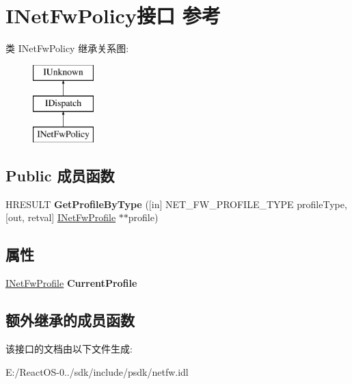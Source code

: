 \hypertarget{interface_i_net_fw_policy}{}\section{I\+Net\+Fw\+Policy接口 参考}
\label{interface_i_net_fw_policy}
类 I\+Net\+Fw\+Policy 继承关系图\+:\begin{figure}[H]
\begin{center}
\leavevmode
\includegraphics[height=3.000000cm]{interface_i_net_fw_policy}
\end{center}
\end{figure}
\subsection*{Public 成员函数}
\begin{DoxyCompactItemize}
\item 
\mbox{\label{interface_i_net_fw_policy_a75deeb7d53617c3ca431bfe8496f6f91}} 
H\+R\+E\+S\+U\+LT {\bfseries Get\+Profile\+By\+Type} (\mbox{[}in\mbox{]} N\+E\+T\+\_\+\+F\+W\+\_\+\+P\+R\+O\+F\+I\+L\+E\+\_\+\+T\+Y\+PE profile\+Type, \mbox{[}out, retval\mbox{]} \hyperlink{interface_i_net_fw_profile}{I\+Net\+Fw\+Profile} $\ast$$\ast$profile)
\end{DoxyCompactItemize}
\subsection*{属性}
\begin{DoxyCompactItemize}
\item 
\mbox{\label{interface_i_net_fw_policy_ae317f57b1df50c5138a2dab6fbc95ff7}} 
\hyperlink{interface_i_net_fw_profile}{I\+Net\+Fw\+Profile} {\bfseries Current\+Profile}
\end{DoxyCompactItemize}
\subsection*{额外继承的成员函数}


该接口的文档由以下文件生成\+:\begin{DoxyCompactItemize}
\item 
E\+:/\+React\+O\+S-\/0../sdk/include/psdk/netfw.\+idl\end{DoxyCompactItemize}
